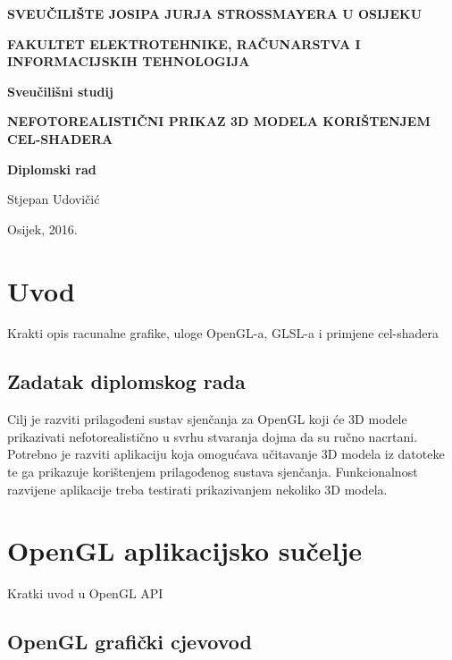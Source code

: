 \documentclass[a4paper]{article}
\begin{document}
\begin{titlepage}
	\centering
	{\bfseries SVEUČILIŠTE JOSIPA JURJA STROSSMAYERA U OSIJEKU\par}
	{\bfseries FAKULTET ELEKTROTEHNIKE, RAČUNARSTVA I INFORMACIJSKIH TEHNOLOGIJA\par}
	
	\vspace{2cm}
	{\bfseries Sveučilišni studij\par}

	\vspace{4cm}
	{\huge\bfseries NEFOTOREALISTIČNI PRIKAZ 3D MODELA KORIŠTENJEM CEL-SHADERA\par}
	
	\vspace{1cm}
	{\bfseries Diplomski rad\par}
	
	\vspace{2cm}
	{\Large Stjepan Udovičić\par}
	
	\vfill
	{Osijek, 2016.\par}
\end{titlepage}

\tableofcontents


\section{Uvod}
Krakti opis racunalne grafike, uloge OpenGL-a, GLSL-a i primjene cel-shadera

\subsection{Zadatak diplomskog rada}

Cilj je razviti prilagođeni sustav sjenčanja za OpenGL koji će 3D modele prikazivati nefotorealistično u svrhu stvaranja dojma da su ručno nacrtani. Potrebno je razviti aplikaciju koja omogućava učitavanje  3D modela iz datoteke te ga prikazuje korištenjem prilagođenog sustava sjenčanja. Funkcionalnost razvijene aplikacije treba testirati prikazivanjem nekoliko 3D modela.


\section{OpenGL aplikacijsko sučelje}

Kratki uvod u OpenGL API

\subsection{OpenGL grafički cjevovod}
\end{document}

